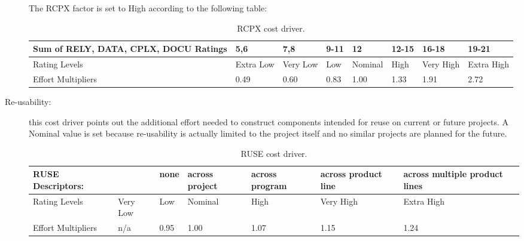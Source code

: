 \begin{description}
The RCPX factor is set to High according to the following table:

\begin{table}[H]
	\begin{adjustwidth}{-.5in}{-.5in}
    \centering
    \begin{tabular}{p{4cm}|p{1cm}|p{1cm}|p{1cm}|p{1.5cm}|p{1cm}|p{1cm}|p{1cm}}
        \hline
        Sum of RELY, DATA, CPLX, DOCU Ratings & 5,6 & 7,8 & 9-11 & 12 & 12-15 & 16-18 & 19-21 \\
        \hline
        \hline
        Rating Levels & Extra Low & Very Low & Low & Nominal & High & Very High & Extra High \\
        \hline
        Effort Multipliers & 0.49 & 0.60 & 0.83 & 1.00 & 1.33 & 1.91 & 2.72 \\
        \hline
    \end{tabular}
    \caption{RCPX cost driver.}
    \end{adjustwidth}
\end{table}

\item[Re-usability:] this cost driver points out the additional effort needed to construct components intended for reuse on current or future projects. A Nominal value is set because re-usability is actually limited to the project itself and no similar projects are planned for the future. 

\begin{table}[H]
	\begin{adjustwidth}{-.5in}{-.5in}
    \centering
    \begin{tabular}{p{3.8cm}|p{1cm}|p{1cm}|p{1.5cm}|p{1.6cm}|p{1.5cm}|p{2cm}}
    	\hline
        RUSE Descriptors: & & none & across project & across program & across product line & across multiple product lines \\
        \hline
        Rating Levels & Very Low & Low & Nominal & High & Very High & Extra High \\
        \hline
        Effort Multipliers & n/a & 0.95 & 1.00 & 1.07 & 1.15 & 1.24 \\
        \hline
    \end{tabular}
    \caption{RUSE cost driver.}
    \end{adjustwidth}
\end{table}


\end{description}
